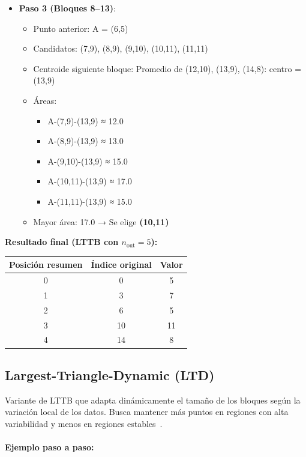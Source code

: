 \begin{itemize}
    \item \textbf{Paso 3 (Bloques 8--13)}:
    \begin{itemize}
        \item Punto anterior: A = (6,5)
        \item Candidatos: (7,9), (8,9), (9,10), (10,11), (11,11)
        \item Centroide siguiente bloque: Promedio de (12,10), (13,9), (14,8): centro = (13,9)
        \item Áreas:
        \begin{itemize}
            \item A-(7,9)-(13,9) ≈ 12.0
            \item A-(8,9)-(13,9) ≈ 13.0
            \item A-(9,10)-(13,9) ≈ 15.0
            \item A-(10,11)-(13,9) ≈ 17.0
            \item A-(11,11)-(13,9) ≈ 15.0
        \end{itemize}
        \item Mayor área: 17.0 → Se elige \textbf{(10,11)}
    \end{itemize}
\end{itemize}

\bigskip

\noindent \textbf{Resultado final (LTTB con $n_{\text{out}} = 5$):}

\begin{center}
\begin{tabular}{|c|c|c|}
\hline
Posición resumen & Índice original & Valor \\
\hline
0 & 0 & 5 \\
1 & 3 & 7 \\
2 & 6 & 5 \\
3 & 10 & 11 \\
4 & 14 & 8 \\
\hline
\end{tabular}
\end{center}

\subsection{Largest-Triangle-Dynamic (LTD)} 
Variante de LTTB que adapta dinámicamente el tamaño de los bloques según la variación local de los datos. Busca mantener más puntos en regiones con alta variabilidad y menos en regiones estables~\cite{steinarsson2013downsampling}.

\paragraph{Ejemplo paso a paso:}

